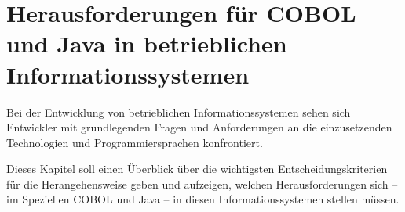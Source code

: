 \chapter{Herausforderungen für COBOL und Java in betrieblichen Informationssystemen}
Bei der Entwicklung von betrieblichen Informationssystemen sehen sich Entwickler mit grundlegenden Fragen und Anforderungen an die einzusetzenden Technologien und Programmiersprachen konfrontiert.

Dieses Kapitel soll einen Überblick über die wichtigsten Entscheidungskriterien für die Herangehensweise geben und aufzeigen, welchen Herausforderungen sich -- im Speziellen COBOL und Java -- in diesen Informationssystemen stellen müssen.

\label{ch:herausforderungen}
    
    
    
    